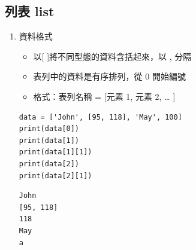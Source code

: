 \documentclass[a4paper,12pt]{article}
\begin{document}
\subsection{列表 list}
\label{sec:org25f54ea}
\begin{enumerate}
\item 資料格式
\label{sec:orge33aef7}
\begin{itemize}
\item 以[ ]將不同型態的資料含括起來，以 , 分隔\\
\item 表列中的資料是有序排列，從 0 開始編號\\
\item 格式：表列名稱 = [元素 1, 元素 2, … ]\\
\end{itemize}
\lstset{breaklines=true,language=Python,label= ,caption= ,captionpos=b,firstnumber=1,numbers=left}
\begin{lstlisting}
data = ['John', [95, 118], 'May', 100]
print(data[0])
print(data[1])
print(data[1][1])
print(data[2])
print(data[2][1])
\end{lstlisting}

\begin{verbatim}
John
[95, 118]
118
May
a
\end{verbatim}


\end{enumerate}
\end{document}
